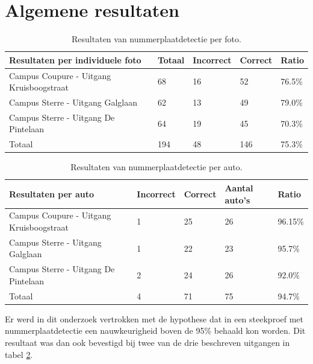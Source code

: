 \section{Algemene resultaten}

\begin{table}[h!]
	\centering
	\begin{tabular}{l|l|l|l|l}
		\textbf{Resultaten per individuele foto}	& \textbf{Totaal}	& \textbf{Incorrect} & \textbf{Correct} & \textbf{Ratio} \\ \hline
		Campus Coupure - Uitgang Kruisboogstraat  & 68 & 16 & 52 & 76.5\% \\
		Campus Sterre - Uitgang Galglaan 		  & 62& 13 & 49 & 79.0\%\\
		Campus Sterre - Uitgang De Pintelaan	  & 64& 19 & 45 & 70.3\%\\ \hline
		Totaal 									  & 194& 48 & 146 & 75.3\%
	\end{tabular}
	\caption{Resultaten van nummerplaatdetectie per foto.}
	\label{tab:perpic}
\end{table}

\begin{table}[h!]
	\centering
	\begin{tabular}{l|l|l|l|l}
		\textbf{Resultaten per auto} & \textbf{Incorrect}	& \textbf{Correct} & \textbf{Aantal auto's} & \textbf{Ratio} \\ \hline
		Campus Coupure - Uitgang Kruisboogstraat& 1 & 25  & 26 & 96.15\% \\
		Campus Sterre - Uitgang Galglaan		& 1 & 22  & 23 & 95.7\%\\
		Campus Sterre - Uitgang De Pintelaan	& 2 & 24  & 26 & 92.0\%\\ \hline
		Totaal 									& 4 & 71 & 75 & 94.7\%
	\end{tabular}
	\caption{Resultaten van nummerplaatdetectie per auto.}
	\label{tab:percar}
\end{table}

Er werd in dit onderzoek vertrokken met de hypothese dat in een steekproef met nummerplaatdetectie een nauwkeurigheid boven de 95\% behaald kon worden. Dit resultaat was dan ook bevestigd bij twee van de drie beschreven uitgangen in tabel \ref{tab:percar}.

